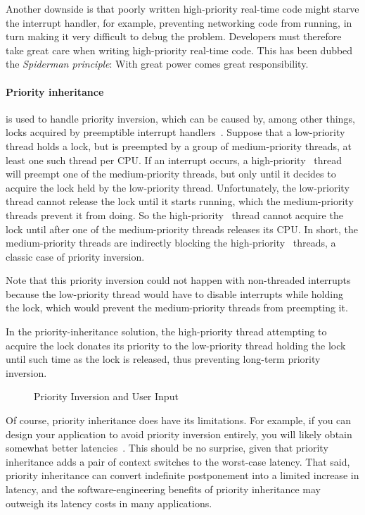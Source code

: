 Another downside is that poorly written high-priority real-time code
might starve the interrupt handler, for example, preventing networking
code from running, in turn making it very difficult to debug the problem.
Developers must therefore take great care when writing high-priority
real-time code.
This has been dubbed the \emph{Spiderman principle}: With great power
comes great responsibility.

\paragraph{Priority inheritance} is used to handle priority inversion,
which can be caused by, among other things, locks acquired by
preemptible interrupt handlers~\cite{LuiSha1990PriorityInheritance}.
Suppose that a low-priority thread holds a lock, but is preempted by
a group of medium-priority threads, at least one such thread per CPU\@.
If an interrupt occurs, a high-priority \IRQ\ thread will preempt one
of the medium-priority threads, but only until it decides to acquire
the lock held by the low-priority thread.
Unfortunately, the low-priority thread cannot release the lock until
it starts running, which the medium-priority threads prevent it from
doing.
So the high-priority \IRQ\ thread cannot acquire the lock until after one
of the medium-priority threads releases its CPU\@.
In short, the medium-priority threads are indirectly blocking the
high-priority \IRQ\ threads, a classic case of priority inversion.

Note that this priority inversion could not happen with non-threaded
interrupts because the low-priority thread would have to disable interrupts
while holding the lock, which would prevent the medium-priority
threads from preempting it.

In the priority-inheritance solution, the high-priority thread attempting
to acquire the lock donates its priority to the low-priority thread holding
the lock until such time as the lock is released, thus preventing long-term
priority inversion.

\begin{figure}
\centering
{}
\caption{Priority Inversion and User Input}
\end{figure}

Of course, priority inheritance does have its limitations.
For example, if you can design your application to avoid priority
inversion entirely, you will likely obtain somewhat better
latencies~\cite{VictorYodaiken2004a}.
This should be no surprise, given that priority inheritance adds
a pair of context switches to the worst-case latency.
That said, priority inheritance can convert indefinite postponement
into a limited increase in latency, and the software-engineering
benefits of priority inheritance may outweigh its latency costs in
many applications.

